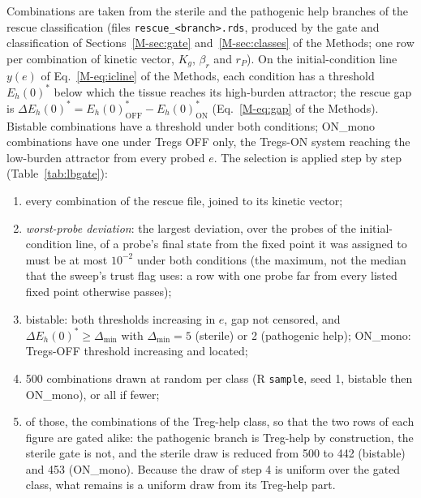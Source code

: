 \documentclass[11pt]{article}
\newcommand{\gap}{\Delta E_h(0)^{*}}
\begin{document}
Combinations are taken from the sterile and the pathogenic help branches of the
rescue classification (files \texttt{rescue\_<branch>.rds}, produced by the gate and
classification of Sections~\ref{M-sec:gate} and~\ref{M-sec:classes} of the Methods; one row per combination of
kinetic vector, $K_g$, $\beta_r$ and $r_P$). On the initial-condition line
$y(e)$ of Eq.~\ref{M-eq:icline} of the Methods, each condition has a threshold
$E_h(0)^*$ below which the tissue reaches its high-burden attractor; the rescue gap is
$\gap = E_h(0)^*_{\mathrm{OFF}}-E_h(0)^*_{\mathrm{ON}}$ (Eq.~\ref{M-eq:gap} of the Methods). Bistable combinations have a threshold
under both conditions; ON\_mono combinations have one under
Tregs OFF only, the Tregs-ON system reaching the low-burden attractor from every probed
$e$. The selection is applied step by step (Table~\ref{tab:lbgate}):
\begin{enumerate}
\item every combination of the rescue file, joined to its kinetic vector;
\item \emph{worst-probe deviation}: the largest deviation, over the probes of the
  initial-condition line, of a probe's final state from the fixed point it was assigned
  to must be at most $10^{-2}$ under both conditions (the maximum, not the median that the
  sweep's trust flag uses: a row with one probe far from every listed fixed point otherwise
  passes);
\item bistable: both thresholds increasing in $e$, gap not censored, and
  $\gap \ge \Delta_{\min}$ with $\Delta_{\min} = 5$ (sterile) or 2 (pathogenic help);
  ON\_mono: Tregs-OFF threshold increasing and located;
\item 500 combinations drawn at random per class (R \texttt{sample}, seed 1, bistable then
  ON\_mono), or all if fewer;
\item of those, the combinations of the Treg-help class, so that the two rows of each figure
  are gated alike: the pathogenic branch is Treg-help by construction, the sterile gate is not,
  and the sterile draw is reduced from 500 to 442 (bistable) and 453 (ON\_mono). Because the
  draw of step 4 is uniform over the gated class, what remains is a uniform draw from its
  Treg-help part.
\end{enumerate}
\end{document}
